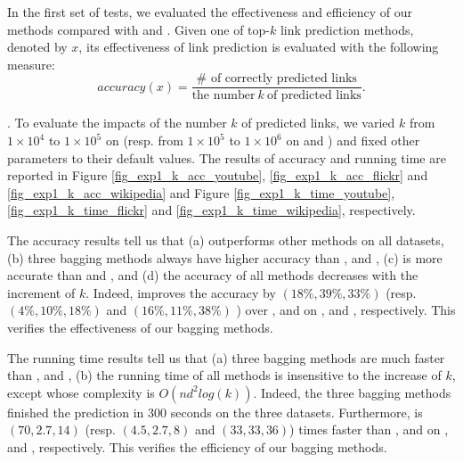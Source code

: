 In the first set of tests,
we evaluated the effectiveness and efficiency of our methods compared with \Aa and
\BIGCLAM. Given one of top-$k$ link prediction methods, denoted by $x$, its effectiveness
of link prediction is evaluated with the following measure:
\begin{equation}
accuracy(x) = \frac{\# \textrm{ of correctly predicted links}}{\textrm{the number} \ k\ \textrm{of predicted links}}.
\end{equation}




. To evaluate the impacts of the number $k$ of predicted links, we varied $k$
from $1\times 10^4$ to $1\times 10^5$ on \YouTube (resp. from $1\times 10^5$ to $1\times 10^6$ on
\Flickr and \Wikipedia) and fixed other parameters to their default values.
The results of accuracy and running time are reported in Figure \ref{fig_exp1_k_acc_youtube},
\ref{fig_exp1_k_acc_flickr} and \ref{fig_exp1_k_acc_wikipedia} and Figure \ref{fig_exp1_k_time_youtube},
\ref{fig_exp1_k_time_flickr} and \ref{fig_exp1_k_time_wikipedia}, respectively.




The accuracy results tell us that (a) \Biased
outperforms other methods on all datasets, (b) three bagging methods always have higher accuracy than \NMF, \Aa
and \BIGCLAM,  (c) \NMF is more accurate
than \Aa and \BIGCLAM, and (d) the accuracy of all methods decreases with the increment of $k$.
Indeed, \Biased improves the accuracy by $(18\%, 39\%, 33\%)$ (resp. $(4\%, 10\%, 18\%)$
and $(16\%, 11\%, 38\%)$ ) over \NMF, \Aa and \BIGCLAM on \YouTube, \Flickr and \Wikipedia,
respectively. This verifies the effectiveness of our bagging methods.


The running time results tell us that (a) three
bagging methods are much faster than \NMF, \Aa and \BIGCLAM, (b) the running time of
all methods is insensitive to the increase of $k$, except \Aa whose complexity is
$O(nd^2log(k))$. Indeed, the three bagging methods finished the prediction in 300 seconds on the
three datasets. Furthermore, \Biased is $(70, 2.7, 14)$ (resp. $(4.5, 2.7, 8)$ and $(33, 33, 36)$) times faster than \NMF, \Aa and
\BIGCLAM on \YouTube, \Flickr and \Wikipedia, respectively. This verifies the
efficiency of our bagging methods.



